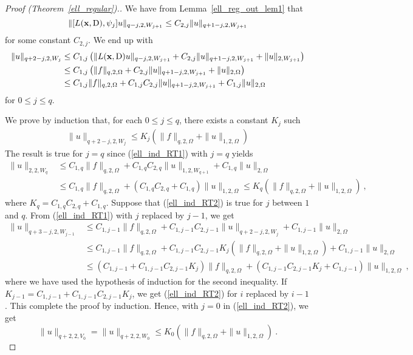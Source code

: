 \begin{proof}[Proof (Theorem~\ref{ell_regular}).]
We have from Lemma~\ref{ell_reg_out_lem1} that
\[
\| [ L(\mathbf{x},\operatorname{D}) , \psi_j] u\|_{q-j,2,W_{j+1}}
\leq C_{2,j} \|u\|_{q+1-j,2,W_{j+1}}
\]
for some constant $C_{2,j}$.  We end up with
\begin{align}
\| u \|_{q+2-j,2,W_j} &\leq C_{1,j} \left( \| L(\mathbf{x},\operatorname{D}) u\|_{q-j,2,W_{j+1}}
+ C_{2,j} \|u\|_{q+1-j,2,W_{j+1}} + \| u \|_{2,W_{j+1}} \right) \nonumber \\
&\leq C_{1,j} \left( \|f\|_{q,2,\Omega}
+ C_{2,j} \|u\|_{q+1-j,2,W_{j+1}} + \| u \|_{2,\Omega} \right) \nonumber \\
&\leq C_{1,j} \|f\|_{q,2,\Omega}
+ C_{1,j} C_{2,j} \|u\|_{q+1-j,2,W_{j+1}} + C_{1,j} \| u \|_{2,\Omega}
\label{ell_ind_RT1}
\end{align}
for $0\leq j \leq q$.

We prove by induction that, for each $0\leq j \leq q$, there
exists a constant $K_j$ such
\begin{align} \label{ell_ind_RT2}
\|u\|_{q+2-j,2,W_j} \leq K_j \left( \|f\|_{q,2,\Omega} + \|u\|_{1,2,\Omega} \right)
\end{align}
The result is true for $j=q$ since (\ref{ell_ind_RT1}) with $j=q$ yields
\begin{align*}
\| u \|_{2,2,W_q} &\leq C_{1,q} \|f\|_{q,2,\Omega}
+ C_{1,q} C_{2,q} \|u\|_{1,2,W_{q+1}} + C_{1,q} \| u \|_{2,\Omega} \\
&\leq C_{1,q} \|f\|_{q,2,\Omega} + \left( C_{1,q} C_{2,q} + C_{1,q}\right)
\| u \|_{1,2,\Omega}
\leq K_q \left( \|f\|_{q,2,\Omega} + \|u\|_{1,2,\Omega} \right) \ ,
\end{align*}
where $K_q = C_{1,q} C_{2,q} + C_{1,q}$.  Suppose that
(\ref{ell_ind_RT2}) is true for $j$ between $1$ and $q$.  From
(\ref{ell_ind_RT1}) with $j$ replaced by $j-1$, we get
\begin{align*}
\| u \|_{q+3-j,2,W_{j-1}} &\leq C_{1,j-1} \|f\|_{q,2,\Omega}
+ C_{1,j-1} C_{2,j-1} \|u\|_{q+2-j,2,W_j} + C_{1,j-1} \| u \|_{2,\Omega} \\
&\leq C_{1,j-1} \|f\|_{q,2,\Omega}
+ C_{1,j-1} C_{2,j-1} K_j \left( \|f\|_{q,2,\Omega} + \|u\|_{1,2,\Omega} \right)
+ C_{1,j-1} \| u \|_{2,\Omega} \\
&\leq \left( C_{1,j-1} + C_{1,j-1} C_{2,j-1} K_j \right) \|f\|_{q,2,\Omega}
+ \left( C_{1,j-1} C_{2,j-1} K_j + C_{1,j-1} \right)\| u \|_{1,2,\Omega} \ ,
\end{align*}
where we have used the hypothesis of induction for the second
inequality.  If
$\displaystyle K_{j-1} = C_{1,j-1} + C_{1,j-1} C_{2,j-1} K_j$,
we get (\ref{ell_ind_RT2}) for $i$ replaced by $i-1$.  This complete
the proof by induction.
Hence, with $j=0$ in (\ref{ell_ind_RT2}), we get
\begin{equation} \label{ell_ind_RT3}
\|u\|_{q+2,2,V_0} = \|u\|_{q+2,2,W_0} \leq K_0
\left( \|f\|_{q,2,\Omega} + \|u\|_{1,2,\Omega} \right) \ .
\end{equation}


\end{proof}
